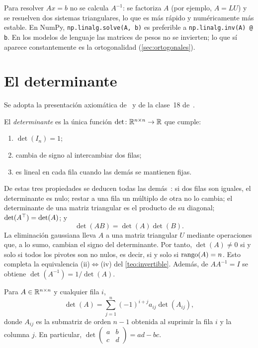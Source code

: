 \begin{observacion}
Para resolver $Ax=b$ no se calcula $A^{-1}$: se factoriza $A$ (por ejemplo, $A=LU$) y se resuelven dos sistemas triangulares, lo que es más rápido y numéricamente más estable. En NumPy, \texttt{np.linalg.solve(A, b)} es preferible a \texttt{np.linalg.inv(A) @ b}. En los modelos de lenguaje las matrices de pesos no se invierten; lo que sí aparece constantemente es la ortogonalidad (\cref{sec:ortogonales}).
\end{observacion}

\section{El determinante}\label{sec:determinante}

Se adopta la presentación axiomática de~\cite[§5.1]{strang-ila} y de la clase~18 de~\cite{mit1806}.

\begin{definicion}[Determinante]\label{def:det}
El \emph{determinante} es la única función $\det\colon\mathbb{R}^{n\times n}\to\mathbb{R}$ que cumple:
\begin{enumerate}
  \item $\det(I_n)=1$;
  \item cambia de signo al intercambiar dos filas;
  \item es lineal en cada fila cuando las demás se mantienen fijas.
\end{enumerate}
\end{definicion}

De estas tres propiedades se deducen todas las demás~\cite[§5.1]{strang-ila}: si dos filas son iguales, el determinante es nulo; restar a una fila un múltiplo de otra no lo cambia; el determinante de una matriz triangular es el producto de su diagonal; $\det(A^{\top})=\det(A)$; y
\[
\det(AB)=\det(A)\det(B).
\]
La eliminación gaussiana lleva $A$ a una matriz triangular $U$ mediante operaciones que, a lo sumo, cambian el signo del determinante. Por tanto, $\det(A)\ne 0$ si y solo si todos los pivotes son no nulos, es decir, si y solo si $\operatorname{rango}(A)=n$. Esto completa la equivalencia (ii)$\Leftrightarrow$(iv) del \cref{teo:invertible}. Además, de $AA^{-1}=I$ se obtiene $\det(A^{-1})=1/\det(A)$.

\begin{proposicion}\label{prop:laplace}
Para $A\in\mathbb{R}^{n\times n}$ y cualquier fila $i$,
\[
\det(A)=\sum_{j=1}^{n}(-1)^{i+j}a_{ij}\det(A_{ij}),
\]
donde $A_{ij}$ es la submatriz de orden $n-1$ obtenida al suprimir la fila $i$ y la columna $j$. En particular, $\det\begin{pmatrix}a&b\\c&d\end{pmatrix}=ad-bc$.
\end{proposicion}

